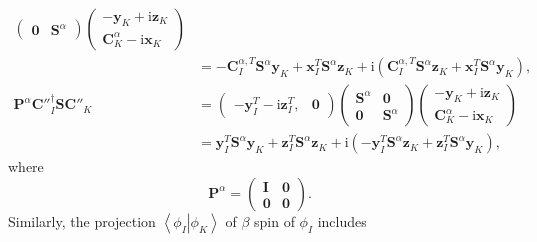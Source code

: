 \documentclass[a4paper,11pt,twoside,openright]{book}
\begin{document}
\begin{align}
\begin{pmatrix}
    \mathbf{0} & \mathbf{S}^{\alpha}
  \end{pmatrix}
  \begin{pmatrix}
    -\mathbf{y}_{K}+\text{i}\mathbf{z}_{K}\\
    \mathbf{C}^{\alpha}_{K}-\text{i}\mathbf{x}_{K}
  \end{pmatrix}\\
  &=-\mathbf{C}^{\alpha,T}_{I}\mathbf{S}^{\alpha}\mathbf{y}_{K}%
    +\mathbf{x}^{T}_{I}\mathbf{S}^{\alpha}\mathbf{z}_{K}%
    +\text{i}\left(\mathbf{C}^{\alpha,T}_{I}\mathbf{S}^{\alpha}\mathbf{z}_{K}%
    +\mathbf{x}^{T}_{I}\mathbf{S}^{\alpha}\mathbf{y}_{K}\right),\nonumber\\
%
  \mathbf{P}^{\alpha}\mathbf{C}''^{\dagger}_{I}\mathbf{S}\mathbf{C}''_{K}
  &=\begin{pmatrix}
    -\mathbf{y}^{T}_{I}-\text{i}\mathbf{z}^{T}_{I}, & \mathbf{0}
  \end{pmatrix}
  \begin{pmatrix}
    \mathbf{S}^{\alpha} & \mathbf{0}\\
    \mathbf{0} & \mathbf{S}^{\alpha}
  \end{pmatrix}
  \begin{pmatrix}
    -\mathbf{y}_{K}+\text{i}\mathbf{z}_{K}\\
    \mathbf{C}^{\alpha}_{K}-\text{i}\mathbf{x}_{K}
  \end{pmatrix}\\
  &=\mathbf{y}^{T}_{I}\mathbf{S}^{\alpha}\mathbf{y}_{K}%
    +\mathbf{z}^{T}_{I}\mathbf{S}^{\alpha}\mathbf{z}_{K}%
    +\text{i}\left(-\mathbf{y}^{T}_{I}\mathbf{S}^{\alpha}\mathbf{z}_{K}%
    +\mathbf{z}^{T}_{I}\mathbf{S}^{\alpha}\mathbf{y}_{K}\right),\nonumber
\end{align}
where
\begin{equation}
  \mathbf{P}^{\alpha}
  =\begin{pmatrix}
    \mathbf{I} & \mathbf{0}\\
    \mathbf{0} & \mathbf{0}
  \end{pmatrix}.
\end{equation}
Similarly, the projection $\left\langle\left.\phi_{I}\right|\phi_{K}\right\rangle$ of $\beta$ spin
of $\phi_{I}$ includes
\end{document}

